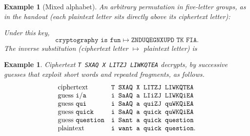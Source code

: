 \documentclass[11pt]{article}
\newtheorem{example}[theorem]{Example}
\theoremstyle{remark}
\begin{document}
\begin{example}[Mixed alphabet]
An arbitrary permutation in five-letter groups, as in the handout
(each plaintext letter sits directly above its ciphertext letter):
\begin{center}
\end{center}
Under this key,
\[
    \texttt{cryptography is fun}
    \longmapsto
    \texttt{ZNDUQEGNXUPD TK FIA}.
\]
The inverse substitution (ciphertext letter $\mapsto$ plaintext letter) is
\begin{center}
\end{center}
\end{example}

\begin{example}
Ciphertext \texttt{T SXAQ X LITZJ LIWKQTEA} decrypts, by successive
guesses that exploit short words and repeated fragments, as follows.
\[
\begin{array}{ll}
\text{ciphertext} & \texttt{T SXAQ X LITZJ LIWKQTEA}\\
\text{guess \texttt{i}/\texttt{a}} &
\texttt{i SaAQ a LIiZJ LIWKQiEA}\\
\text{guess \texttt{qui}} &
\texttt{i SaAQ a quiZJ quWKQiEA}\\
\text{guess \texttt{quick}} &
\texttt{i SaAQ a quick quWKQiEA}\\
\text{guess \texttt{question}} &
\texttt{i Sant a quick question}\\
\text{plaintext} &
\texttt{i want a quick question}.
\end{array}
\]
\end{example}
\end{document}
